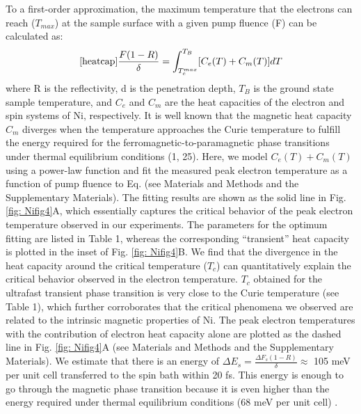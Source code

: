To a first-order approximation, the maximum temperature that the electrons can reach ($T_{max}$) at the sample surface with a given pump fluence (F) can be calculated as:
\begin{equation}
\ref{heatcap}
\frac{F(1-R)}{\delta}=\int_{T_{e}^{max}}^{T_{B}}[C_{e}(T)+C_{m}(T)]dT
\label{eqn: 1}
\end{equation}
where R is the reflectivity, d is the penetration depth, $T_{B}$ is the ground state sample temperature, and $C_{e}$ and $C_{m}$ are the heat capacities of the electron and spin systems of Ni, respectively. It is well known that the magnetic heat capacity $C_{m}$ diverges when the temperature approaches the Curie temperature to fulfill the energy required for the ferromagnetic-to-paramagnetic phase transitions under thermal equilibrium conditions \cite{Stohr2006,Meschter1981}(1, 25). Here, we model $C_{e}(T)+C_{m}(T)$ using a power-law function and fit the measured peak electron temperature as a function of pump fluence to Eq.  (see Materials and Methods and the Supplementary Materials). The fitting results are shown as the solid line in Fig. \ref{fig: Nifig4}A, which essentially captures the critical behavior of the peak electron temperature observed in our experiments. The parameters for the optimum fitting are listed in Table 1, whereas the corresponding “transient” heat capacity is plotted in the inset of Fig. \ref{fig: Nifig4}B. We find that the divergence in the heat capacity around the critical temperature ($T_{c}$) can quantitatively explain the critical behavior observed in the electron temperature. $T_{c}$ obtained for the ultrafast transient phase transition is very close to the Curie temperature (see Table 1), which further corroborates that the critical phenomena we observed are related to the intrinsic magnetic properties of Ni. The peak electron temperatures with the contribution of electron heat capacity alone are plotted as the dashed line in Fig. \ref{fig: Nifig4}A (see Materials and Methods and the Supplementary Materials). We estimate that there is an energy of $\Delta E_{s}=\frac{\Delta F_{s}(1-R)}{\delta}\approx$ 105 meV per unit cell transferred to the spin bath within 20 fs. This energy is enough to go through the magnetic phase transition because it is even higher than the energy required under thermal equilibrium conditions (68 meV per unit cell) \cite{Meschter1981}.

